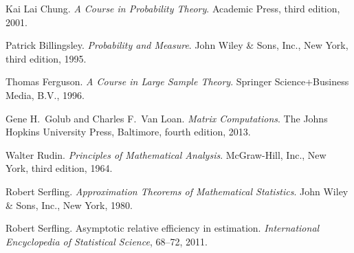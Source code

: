 \documentclass{article}
\theoremstyle{definition}
\theoremstyle{plain}
\theoremstyle{remark}
\begin{document}
\begin{thebibliography}{9}
  Kai Lai Chung.
  \emph{A Course in Probability Theory}.
  Academic Press, 
  third edition, 2001.

  Patrick Billingsley.
  \emph{Probability and Measure}.
  John Wiley \& Sons, Inc., New York,
  third edition,
  1995.
  
  Thomas Ferguson.
  \emph{A Course in Large Sample Theory}.
  Springer Science+Business Media, B.V.,
  1996.

  Gene H.~Golub and Charles F.~Van Loan.
  \emph{Matrix Computations}.
  The Johns Hopkins University Press, Baltimore,
  fourth edition,
  2013.

  Walter Rudin.
  \emph{Principles of Mathematical Analysis}.
  McGraw-Hill, Inc., New York,
  third edition,
  1964.

  Robert Serfling.
  \emph{Approximation Theorems of Mathematical Statistics}. 
  John Wiley \& Sons, Inc., New York,
  1980.
 
  Robert Serfling.
  Asymptotic relative efficiency in estimation.
  \emph{International Encyclopedia of Statistical Science},
  68--72,
  2011.

\end{thebibliography}
\end{document}
